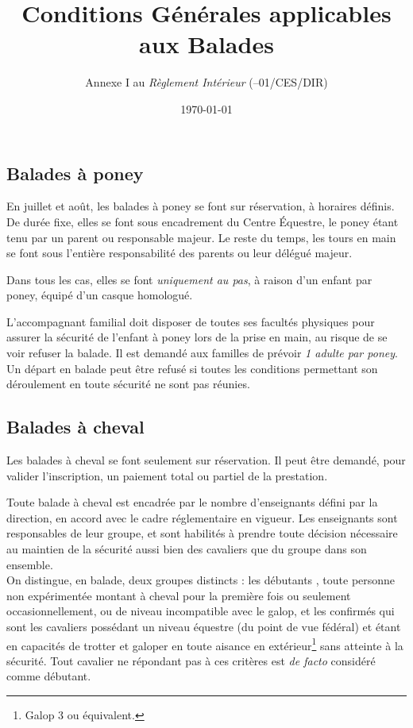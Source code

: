 \documentclass[11pt,a4paper]{article}
\title[Conditions Générales applicables aux Balades \\ version du \today]{Conditions Générales applicables aux Balades}
\subtitle{Annexe I au \textit{Règlement Intérieur} (\no 26--01/CES/DIR)}
\author{}
\date{\today}
\begin{document}
   \annexHeader{}
   \maketitle

   \vspace{-30pt}

   \subsection*{Balades à poney}
   En juillet et août, les balades à poney se font sur réservation, à horaires définis.
   De durée fixe, elles se font sous encadrement du Centre Équestre, le poney étant tenu par un parent ou responsable majeur.
   Le reste du temps, les tours en main se font sous l'entière responsabilité des parents ou leur délégué majeur.

   Dans tous les cas, elles se font \emph{uniquement au pas}, à raison d'un enfant par poney, équipé d'un casque homologué.

   L'accompagnant familial doit disposer de toutes ses facultés physiques pour assurer la sécurité de l'enfant à poney lors de la prise en main, au risque de se voir refuser la balade.
   Il est demandé aux familles de prévoir \emph{1 adulte par poney}.
   Un départ en balade peut être refusé si toutes les conditions permettant son déroulement en toute sécurité ne sont pas réunies.

   \subsection*{Balades à cheval}
   Les balades à cheval se font seulement sur réservation.
   Il peut être demandé, pour valider l'inscription, un paiement total ou partiel de la prestation.

   Toute balade à cheval est encadrée par le nombre d'enseignants défini par la direction, en accord avec le cadre réglementaire en vigueur.
   Les enseignants sont responsables de leur groupe, et sont habilités à prendre toute décision nécessaire au maintien de la sécurité aussi bien des cavaliers que du groupe dans son ensemble.
   \\

   On distingue, en balade, deux groupes distincts : les \og débutants \fg{}, toute personne non expérimentée montant à cheval pour la première fois ou seulement occasionnellement, ou de niveau incompatible avec le galop, et les \og confirmés \fg{} qui sont les cavaliers possédant un niveau équestre (du point de vue fédéral) et étant en capacités de trotter et galoper en toute aisance en extérieur\footnote{Galop 3 ou équivalent.} sans atteinte à la sécurité.
   Tout cavalier ne répondant pas à ces critères est \textit{de facto} considéré comme débutant.
\end{document}
